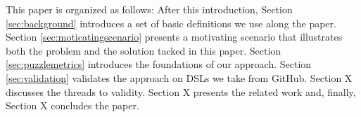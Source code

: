 
This paper is organized as follows: After this introduction, Section \ref{sec:background} introduces a set of basic definitions we use along the paper. Section \ref{sec:moticatingscenario} presents a motivating scenario that illustrates both the problem and the solution tacked in this paper. Section \ref{sec:puzzlemetrics} introduces the foundations of our approach. Section \ref{sec:validation} validates the approach on DSLs we take from GitHub. Section X discusses the threads to validity. Section X presents the related work and, finally, Section X concludes the paper. 

